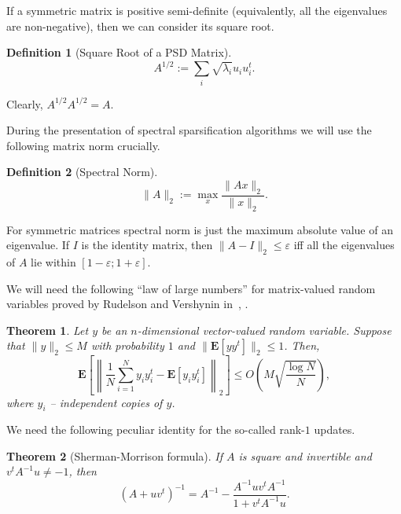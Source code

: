 \documentclass[12pt]{article}
\newcommand{\eps}{\varepsilon}
\newtheorem{theorem}{Theorem}
\newtheorem{definition}{Definition}
\begin{document}
    If a symmetric matrix is positive semi-definite (equivalently, all the eigenvalues
    are non-negative), then we can consider its square root.

    \begin{definition}[Square Root of a PSD Matrix]
        $$
            A^{1/2} := \sum_{i} \sqrt{\lambda_i} u_i u_i^t.
        $$
    \end{definition}
    Clearly, $A^{1/2} A^{1/2} = A$.

    During the presentation of spectral sparsification algorithms we will use the following
    matrix norm crucially.

    \begin{definition}[Spectral Norm]
        $$
            \|A\|_2 := \max_{x} \frac{\|Ax\|_2}{\|x\|_2}.
        $$
    \end{definition}

    For symmetric matrices spectral norm is just the maximum absolute value of an eigenvalue.
    If $I$ is the identity matrix, then $\|A - I\|_2 \leq \eps$ iff all the eigenvalues of
    $A$ lie within $[1 - \eps; 1 + \eps]$.

    We will need the following ``law of large numbers'' for matrix-valued random variables proved by Rudelson and Vershynin
    in~\cite{R96}, \cite{RV07}.
    \begin{theorem}
        \label{rv_inequality}
        Let $y$ be an $n$-dimensional vector-valued random variable.
        Suppose that $\|y\|_2 \leq M$ with probability $1$ and
        $\|\mathbf{E}[yy^t]\|_2 \leq 1$. Then,
        \begin{equation}
            \label{rv_formula}
            \mathbf{E}\left[\left\|\frac{1}{N} \sum_{i = 1}^{N} y_i y_i^t - \mathbf{E}[y_i y_i^t]\right\|_2\right]
            \leq O\left(M \sqrt{\frac{\log N}{N}}\right),
        \end{equation}
        where $y_i$ -- independent copies of $y$.
    \end{theorem}

    We need the following peculiar identity for the so-called rank-$1$ updates.

    \begin{theorem}[Sherman-Morrison formula]
        \label{sherman_morrison}
        If $A$ is square and invertible and $v^tA^{-1}u \ne -1$, then
        $$
            (A + uv^t)^{-1} = A^{-1} - \frac{A^{-1}uv^tA^{-1}}{1 + v^tA^{-1}u}.
        $$
    \end{theorem}
\end{document}

